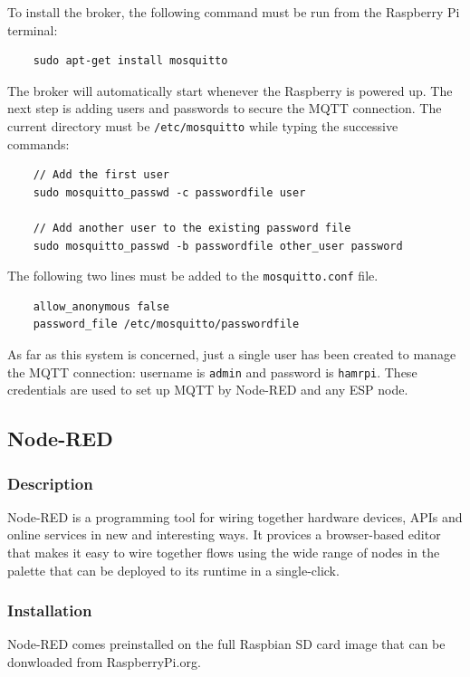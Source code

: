 To install the broker, the following command must be run from the Raspberry Pi terminal:

\begin{verbatim}
    sudo apt-get install mosquitto
\end{verbatim}

\noindent
The broker will automatically start whenever the Raspberry is powered up. The next step is adding users and passwords to secure the MQTT connection. The current directory must be \texttt{/etc/mosquitto} while typing the successive commands:

\begin{verbatim}
    // Add the first user
    sudo mosquitto_passwd -c passwordfile user
    
    // Add another user to the existing password file
    sudo mosquitto_passwd -b passwordfile other_user password
\end{verbatim}

\noindent
The following two lines must be added to the \texttt{mosquitto.conf} file.

\begin{verbatim}
    allow_anonymous false
    password_file /etc/mosquitto/passwordfile
\end{verbatim}

\noindent
As far as this system is concerned, just a single user has been created to manage the MQTT connection: username is \texttt{admin} and password is \texttt{hamrpi}. These credentials are used to set up MQTT by Node-RED and any ESP node.

\subsection{Node-RED}

\subsubsection{Description}
Node-RED is a programming tool for wiring together hardware devices, APIs and online services in new and interesting ways.
It provices a browser-based editor that makes it easy to wire together flows using the wide range of nodes in the palette that can be deployed to its runtime in a single-click.

\subsubsection{Installation}
Node-RED comes preinstalled on the full Raspbian SD card image that can be donwloaded from RaspberryPi.org.

